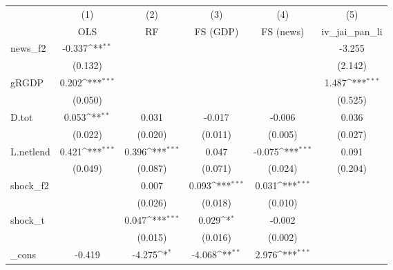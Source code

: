 {
\def\sym#1{\ifmmode^{#1}\else\(^{#1}\)\fi}
\begin{tabular}{l*{5}{c}}
\toprule
            &\multicolumn{1}{c}{(1)}&\multicolumn{1}{c}{(2)}&\multicolumn{1}{c}{(3)}&\multicolumn{1}{c}{(4)}&\multicolumn{1}{c}{(5)}\\
            &\multicolumn{1}{c}{OLS}&\multicolumn{1}{c}{RF}&\multicolumn{1}{c}{FS (GDP)}&\multicolumn{1}{c}{FS (news)}&\multicolumn{1}{c}{iv\_jai\_pan\_li}\\
\midrule
news\_f2     &      -0.337\sym{**} &                     &                     &                     &      -3.255         \\
            &     (0.132)         &                     &                     &                     &     (2.142)         \\
\addlinespace
gRGDP       &       0.202\sym{***}&                     &                     &                     &       1.487\sym{***}\\
            &     (0.050)         &                     &                     &                     &     (0.525)         \\
\addlinespace
D.tot       &       0.053\sym{**} &       0.031         &      -0.017         &      -0.006         &       0.036         \\
            &     (0.022)         &     (0.020)         &     (0.011)         &     (0.005)         &     (0.027)         \\
\addlinespace
L.netlend   &       0.421\sym{***}&       0.396\sym{***}&       0.047         &      -0.075\sym{***}&       0.091         \\
            &     (0.049)         &     (0.087)         &     (0.071)         &     (0.024)         &     (0.204)         \\
\addlinespace
shock\_f2    &                     &       0.007         &       0.093\sym{***}&       0.031\sym{***}&                     \\
            &                     &     (0.026)         &     (0.018)         &     (0.010)         &                     \\
\addlinespace
shock\_t     &                     &       0.047\sym{***}&       0.029\sym{*}  &      -0.002         &                     \\
            &                     &     (0.015)         &     (0.016)         &     (0.002)         &                     \\
\addlinespace
\_cons      &      -0.419         &      -4.275\sym{*}  &      -4.068\sym{**} &       2.976\sym{***}&                     \\

\end{tabular}}
